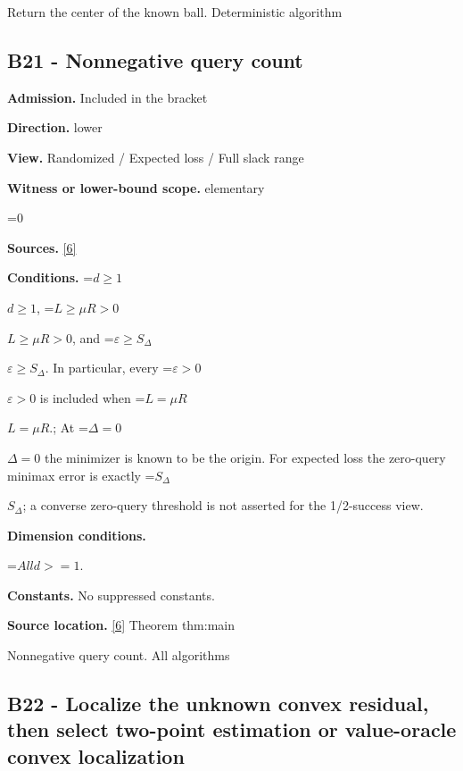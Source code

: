 \documentclass[10pt,a4paper]{article}
\newcommand{\AtlasMath}[1]{\par\begingroup\centering\setbox0=\hbox{$\displaystyle #1$}\ifdim\wd0>1.4\linewidth\typeout{ATLAS WIDE FORMULA: \the\wd0}\fi\ifdim\wd0>\linewidth\resizebox{\linewidth}{!}{\box0}\else\box0\fi\par\endgroup}
\newcommand{\AtlasInlineMath}[1]{\begingroup\setbox0=\hbox{$#1$}\ifdim\wd0>.4\linewidth\endgroup\AtlasMath{#1}\else\endgroup$#1$\fi}
\begin{document}
Return the center of the known ball. Deterministic algorithm



\subsection{B21 - Nonnegative query count}


\textbf{Admission.} Included in the bracket



\textbf{Direction.} lower



\textbf{View.} Randomized / Expected loss / Full slack range



\textbf{Witness or lower-bound scope.} elementary



\AtlasMath{0}


\textbf{Sources.} \href{https://github.com/WU-Wendao/Colombo/blob/main/colombo_sensorium/Complexity_altas/data/sources/colombo/U10/manuscript.pdf}{[6]}



\textbf{Conditions.} \AtlasInlineMath{d\ge1}, \AtlasInlineMath{L\ge\mu R>0}, and \AtlasInlineMath{\varepsilon\ge S_\Delta}. In particular, every \AtlasInlineMath{\varepsilon>0} is included when \AtlasInlineMath{L=\mu R}.; At \AtlasInlineMath{\Delta=0} the minimizer is known to be the origin. For expected loss the zero-query minimax error is exactly \AtlasInlineMath{S_\Delta}; a converse zero-query threshold is not asserted for the 1/2-success view.



\textbf{Dimension conditions.}



\AtlasMath{All d>=1.}


\textbf{Constants.} No suppressed constants.



\textbf{Source location.} \href{https://github.com/WU-Wendao/Colombo/blob/main/colombo_sensorium/Complexity_altas/data/sources/colombo/U10/manuscript.pdf}{[6]} Theorem thm:main



Nonnegative query count. All algorithms



\subsection{B22 - Localize the unknown convex residual, then select two-point estimation or value-oracle convex localization}
\end{document}
